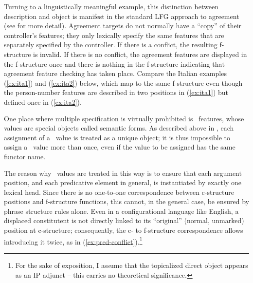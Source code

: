 \documentclass[output=paper,hidelinks]{langscibook}
\begin{document}
 Turning to a linguistically meaningful example, this distinction between description and object is manifest in the standard LFG approach to agreement (see  for more detail). Agreement targets do not normally have a ``copy'' of their controller's features; they only lexically specify the same features that are separately specified by the controller. If there is a conflict, the resulting f-structure is invalid. If there is no conflict, the agreement features are displayed in the f-structure once and there is nothing in the f-structure indicating that agreement feature checking has taken place. Compare the Italian examples (\ref{ex:ita1}) and (\ref{ex:ita2}) below, which map to the same f-structure even though the person-number features are described in two positions in (\ref{ex:ita1}) but defined once in (\ref{ex:ita2}).

 
 One place where multiple specification is virtually prohibited is \PRED\ features, whose values are special objects called semantic forms. As described above in , each assignment of a \PRED\ value is treated as a unique object; it is thus impossible to assign a \PRED\ value more than once, even if the value to be assigned has the same functor name.
 
 The reason why \PRED\ values are treated in this way is to ensure that each argument position, and each predicative element in general, is instantiated by exactly one lexical head. Since there is no one-to-one correspondence between c-structure positions and f-structure functions, this cannot, in the general case, be ensured by phrase structure rules alone.  Even in a configurational language like English, a displaced constitutent is not directly linked to its ``original'' (normal, unmarked) position at c-structure; consequently, the c- to f-structure correspondence allows introducing it twice, as in (\ref{ex:pred-conflict}).\footnote{For the sake of exposition, I assume that the topicalized direct object appears as an IP adjunct -- this carries no theoretical significance.}
 
\end{document}
